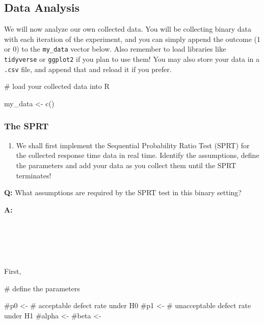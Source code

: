 \documentclass[
  letterpaper,
  DIV=11,
  numbers=noendperiod]{scrartcl}
\newenvironment{Shaded}{\begin{snugshade}}{\end{snugshade}}
\newcommand{\CommentTok}[1]{\textcolor[rgb]{0.37,0.37,0.37}{#1}}
\newcommand{\FunctionTok}[1]{\textcolor[rgb]{0.28,0.35,0.67}{#1}}
\newcommand{\NormalTok}[1]{\textcolor[rgb]{0.00,0.23,0.31}{#1}}
\newcommand{\OtherTok}[1]{\textcolor[rgb]{0.00,0.23,0.31}{#1}}
\providecommand{\tightlist}{%
  \setlength{\itemsep}{0pt}\setlength{\parskip}{0pt}}
\begin{document}
\hfill\break
\hfill\break
\hfill\break
\hfill\break
\hfill\break

\subsection{Data Analysis}\label{data-analysis}

We will now analyze our own collected data. You will be collecting
binary data with each iteration of the experiment, and you can simply
append the outcome (1 or 0) to the \texttt{my\_data} vector below. Also
remember to load libraries like \texttt{tidyverse} or \texttt{ggplot2}
if you plan to use them! You may also store your data in a \texttt{.csv}
file, and append that and reload it if you prefer.

\begin{Shaded}
\begin{Highlighting}[]
\CommentTok{\# load your collected data into R}

\NormalTok{my\_data }\OtherTok{\textless{}{-}} \FunctionTok{c}\NormalTok{()}
\end{Highlighting}
\end{Shaded}

\subsubsection{The SPRT}\label{the-sprt}

\begin{enumerate}
\def\labelenumi{\arabic{enumi}.}
\setcounter{enumi}{11}
\tightlist
\item
  We shall first implement the Sequential Probability Ratio Test (SPRT)
  for the collected response time data in real time. Identify the
  assumptions, define the parameters and add your data as you collect
  them until the SPRT terminates!
\end{enumerate}

\textbf{Q:} What assumptions are required by the SPRT test in this
binary setting?

\textbf{A:}\\
\strut \\
\strut \\
\strut \\

First,

\begin{Shaded}
\begin{Highlighting}[]
\CommentTok{\# define the parameters}

\CommentTok{\#p0 \textless{}{-}      \# acceptable defect rate under H0}
\CommentTok{\#p1 \textless{}{-}      \# unacceptable defect rate under H1}
\CommentTok{\#alpha \textless{}{-}}
\CommentTok{\#beta  \textless{}{-}}
\end{Highlighting}
\end{Shaded}
\end{document}

